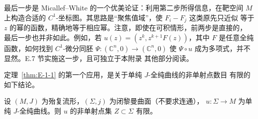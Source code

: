 最后一步是 Micallef--White 的一个优美论证：利用第二步所得信息，在靶空间 $M$
上构造合适的 $C^1$-坐标图。其思路是“聚焦值域”，使 $F_i-F_j$ 这类原先只近似
等于 $z$ 的幂的函数，精确地等于相应幂。注意，即使在可积情形，前两步是直接的，
最后一步也并非如此。例如，若 $u(z)=(z^k,z^{k+1}F(z))$，其中 $F$ 是任意全纯
函数，如何找到 $C^1$-微分同胚 $\Psi:(\mathbb C^n,0)\to(\mathbb C^n,0)$
使 $\Psi\circ u$ 成为多项式，并不显然。E.7 节实施这一步，且可独立于本附录
其他部分阅读。

定理~\ref{thm:E-1-1} 的第一个应用，是关于单纯 $J$-全纯曲线的非单射点数目
有限的如下结论。

\begin{theorem}\label{thm:E-1-2}
设 $(M,J)$ 为殆复流形，$(\Sigma,j)$ 为闭黎曼曲面（不要求连通），
$u:\Sigma\to M$ 为单纯 $J$-全纯曲线。则 $u$ 的非单射点集 $Z\subset\Sigma$ 有限。
\end{theorem}
